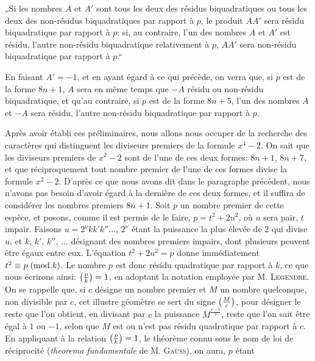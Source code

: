 \par\indent
„Si les nombres $A$ et $A'$ sont tous les deux des résidus biquadratiques
ou tous les deux des non-résidus biquadratiques par rapport à $p$, le produit
$AA'$ sera résidu biquadratique par rapport à $p$; si, au contraire, l'un des nombres
$A$ et $A'$ est résidu, l'autre non-résidu biquadratique relativement à $p$, $AA'$ sera
non-résidu biquadratique par rapport à $p$.“
\par\indent
En faisant $A'=-1$, et en ayant égard à ce qui précède, on verra que,
si $p$ est de la forme $8n+1$, $A$ sera en même temps que $-A$ résidu ou
non-résidu biquadratique, et qu'au contraire, si $p$ est de la forme $8n+5$,
l'un des nombres $A$ et $-A$ sera résidu, l'autre non-résidu biquadratique par
rapport à $p$.
\par\indent
Après avoir établi ces préliminaires, nous allons nous occuper de la recherche
des caractères qui distinguent les diviseurs premiers de la formule $x^4-2$.
On sait que les diviseurs premiers de $x^2-2$ sont de l'une de ces deux formes:
$8n+1$, $8n+7$, et que réciproquement tout nombre premier de l'une de ces
formes divise la formule $x^2-2$. D'après ce que nous avons dit dans le paragraphe
précédent, nous n'avons pas besoin d'avoir égard à la dernière de ces
deux formes, et il suffira de considérer les nombres premiers $8n+1$. Soit $p$
un nombre premier de cette espèce, et posons, comme il est permis de le faire,
$p=t^2+2u^2$, où $u$ sera pair, $t$ impair. Faisons $u=2^\nu kk'k''\ldots$, $2^\nu$ étant la
puissance la plus élevée de $2$ qui divise $u$, et $k$, $k'$, $k''$, $\ldots$ désignant des
nombres premiers impairs, dont plusieurs peuvent être égaux entre eux.
L'équation $t^2+2u^2=p$ donne immédiatement $t^2\equiv p\;(\mathrm{mod}.k)$. Le nombre $p$
est donc résidu quadratique par rapport à $k$, ce que nous écrirons ainsi:
$\left(\frac{p}{k}\right)=1$, en adoptant la notation employée par M. \textsc{Legendre}. On se rappelle
que, si $c$ désigne un nombre premier et $M$ un nombre quelconque, non divisible
par $c$, cet illustre géomètre se sert du signe $\left(\frac{M}{c}\right)$, pour désigner le reste
que l'on obtient, en divisant par $c$ la puissance $M^{\frac{c-1}{2}}$, reste que l'on sait être
égal à $1$ ou $-1$, selon que $M$ est ou n'est pas résidu quadratique par rapport
à $c$. En appliquant à la relation $\left(\frac{p}{k}\right)=1$, le théorème connu sous le nom
de loi de réciprocité (\emph{theorema fundamentale} de M. \textsc{Gauss}), on aura, $p$ étant
